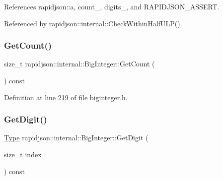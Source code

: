 References rapidjson\+::a, count\+\_\+, digits\+\_\+, and R\+A\+P\+I\+D\+J\+S\+O\+N\+\_\+\+A\+S\+S\+E\+RT.



Referenced by rapidjson\+::internal\+::\+Check\+Within\+Half\+U\+L\+P().

\mbox{\label{classrapidjson_1_1internal_1_1_big_integer_a2eabd50da3448f21c61cc0ba487a4b17}} 
\subsubsection{\texorpdfstring{GetCount()}{GetCount()}}
{\footnotesize\ttfamily size\+\_\+t rapidjson\+::internal\+::\+Big\+Integer\+::\+Get\+Count (\begin{DoxyParamCaption}{ }\end{DoxyParamCaption}) const}



Definition at line 219 of file biginteger.\+h.


\begin{DoxyCode}{0}

\end{DoxyCode}
\mbox{\label{classrapidjson_1_1internal_1_1_big_integer_af6712b16f2f289ab2b37b7c712baf557}} 
\subsubsection{\texorpdfstring{GetDigit()}{GetDigit()}}
{\footnotesize\ttfamily \mbox{\hyperlink{classrapidjson_1_1internal_1_1_big_integer_a37d8e8c111f0d76fa07bb4da4790514d}{Type}} rapidjson\+::internal\+::\+Big\+Integer\+::\+Get\+Digit (\begin{DoxyParamCaption}\item[{size\+\_\+t}]{index }\end{DoxyParamCaption}) const}



